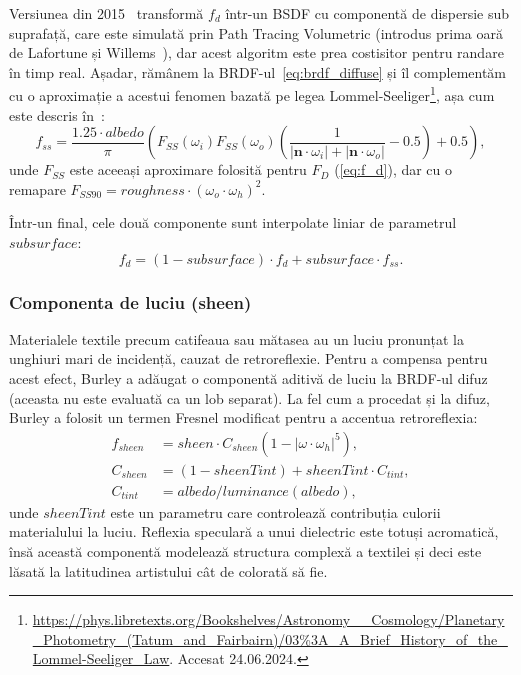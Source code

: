 \documentclass[12pt,a4paper]{report}
\numberwithin{equation}{section} %
\begin{document}
Versiunea din 2015~\cite{DisneyBSDF} transformă $f_d$ într-un BSDF cu componentă de dispersie
sub suprafață, care este simulată prin Path Tracing Volumetric (introdus prima oară de Lafortune și Willems~\cite{Volumetric}),
dar acest algoritm este prea costisitor pentru randare în timp real.
Așadar, rămânem la BRDF-ul~\ref{eq:brdf_diffuse} și îl complementăm cu o aproximație
a acestui fenomen bazată pe legea Lommel-Seeliger\footnote{\url{https://phys.libretexts.org/Bookshelves/Astronomy__Cosmology/Planetary_Photometry_(Tatum_and_Fairbairn)/03\%3A_A_Brief_History_of_the_Lommel-Seeliger_Law}. Accesat 24.06.2024.}, așa cum este descris în~\cite{DisneyHomework}:
\begin{equation}
	f_{ss} = \dfrac{1.25\cdot albedo}{\pi} \left(F_{SS}(\omega_i)F_{SS}(\omega_o) \left(\dfrac{1}{|\mathbf{n} \cdot \omega_i| + |\mathbf{n} \cdot \omega_o|} - 0.5\right) + 0.5 \right),
\end{equation}
unde $F_{SS}$ este aceeași aproximare folosită pentru $F_D$ (\ref{eq:f_d}), dar cu o remapare $F_{SS90} = roughness\cdot (\omega_o\cdot \omega_h)^2$.

Într-un final, cele două componente sunt interpolate liniar de parametrul $subsurface$:
\begin{equation}\label{eq:disney_diffuse}
	f_{d} = (1 - subsurface)\cdot f_d + subsurface\cdot f_{ss}.
\end{equation}

\subsubsection*{Componenta de luciu (sheen)}

Materialele textile precum catifeaua sau mătasea au un luciu pronunțat la unghiuri
mari de incidență, cauzat de retroreflexie. Pentru a compensa pentru acest efect,
Burley a adăugat o componentă aditivă de luciu la BRDF-ul difuz (aceasta nu este
evaluată ca un lob separat). La fel cum a procedat și la difuz, Burley a folosit
un termen Fresnel modificat pentru a accentua retroreflexia:
\begin{equation}
	\begin{aligned}\label{eq:disney_sheen}
		f_{sheen} & = sheen\cdot C_{sheen}(1 - |\omega\cdot\omega_h|^5), \\
		C_{sheen} & = (1 - sheenTint) + sheenTint\cdot C_{tint},         \\
		C_{tint}  & = albedo/luminance(albedo),
	\end{aligned}
\end{equation}
unde $sheenTint$ este un parametru care controlează contribuția culorii materialului
la luciu. Reflexia speculară a unui dielectric este totuși acromatică, însă această
componentă modelează structura complexă a textilei și deci este lăsată la latitudinea
artistului cât de colorată să fie.
\end{document}
